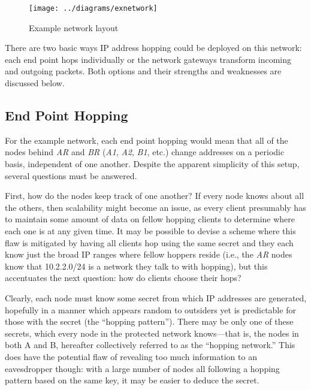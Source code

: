 \begin{figure}
	\centering
	\texttt{[image: ../diagrams/exnetwork]}
	\caption{Example network layout }
	\label{fig:exnetwork}
\end{figure}

\par There are two basic ways IP address hopping could be deployed on this network: each end point hops individually or the network gateways transform incoming and outgoing packets. Both options and their strengths and weaknesses are discussed below.

\subsection{End Point Hopping}
\par For the example network, each end point hopping would mean that all of the nodes behind \textit{AR} and \textit{BR} (\textit{A1}, \textit{A2}, \textit{B1}, etc.) change addresses on a periodic basis, independent of one another. Despite the apparent simplicity of this setup, several questions must be answered.

\par First, how do the nodes keep track of one another? If every node knows about all the others, then scalability might become an issue, as every client presumably has to maintain some amount of data on fellow hopping clients to determine where each one is at any given time. It may be possible to devise a scheme where this flaw is mitigated by having all clients hop using the same secret and they each know just the broad IP ranges where fellow hoppers reside (i.e., the \textit{AR} nodes know that 10.2.2.0/24 is a network they talk to with hopping), but this accentuates the next question: how do clients choose their hops?

\par Clearly, each node must know some secret from which IP addresses are generated, hopefully in a manner which appears random to outsiders yet is predictable for those with the secret (the ``hopping pattern''). There may be only one of these secrets, which every node in the protected network knows---that is, the nodes in both A and B, hereafter collectively referred to as the ``hopping network.'' This does have the potential flaw of revealing too much information to an eavesdropper though: with a large number of nodes all following a hopping pattern based on the same key, it may be easier to deduce the secret.

